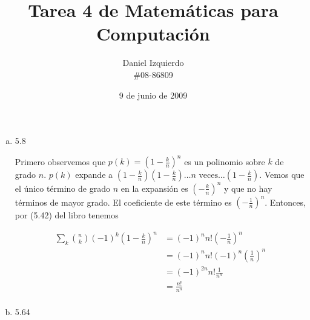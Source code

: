 \documentclass{article}
\begin{document}

\title{Tarea 4 de Matemáticas para Computación}
\author{Daniel Izquierdo \\ \#08-86809}
\date{9 de junio de 2009}

\maketitle

\section{}

\begin{enumerate}[a.]

 \item 5.8

Primero observemos que $p(k) = (1-\frac{k}{n})^n$ es un polinomio sobre $k$ de
grado $n$. $p(k)$ expande a
$(1-\frac{k}{n})(1-\frac{k}{n})\ldots n \text{ veces} \ldots(1-\frac{k}{n})$.
Vemos que el único término de grado $n$ en la expansión es $(-\frac{k}{n})^n$
y que no hay términos de mayor grado. El coeficiente de este término es
$(-\frac{1}{n})^n$. Entonces, por (5.42) del libro tenemos

\begin{align*}
\sum_k \binom{n}{k} (-1)^k (1-\frac{k}{n})^n & = (-1)^n n! (-\frac{1}{n})^n\\
                                             & = (-1)^n n! (-1)^n (\frac{1}{n})^n\\
                                             & = (-1)^{2n} n! \frac{1}{n^n}\\
                                             & = \frac{n!}{n^n}\\
\end{align*}

 \item 5.64

\end{enumerate}

\section{}

\section{}
\end{document}
